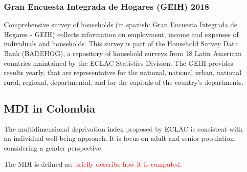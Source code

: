 \documentclass[a4paper, 11pt]{article}
\begin{document}
\subsubsection{Gran Encuesta Integrada de Hogares (GEIH) 2018}

Comprehensive survey of households (in spanish: Gran Encuesta Integrada de Hogares - GEIH) collects information on employment, income and expenses of individuals and households. This survey is part of the Household Survey Data Bank (BADEHOG), a repository of household surveys from 18 Latin American countries maintained by the ECLAC Statistics Division.  The GEIH provides results yearly, that are representative for the national, national urban, national rural, regional, departmental, and for the capitals of the country's departments.  
    

    

\subsection{MDI in Colombia}

The multidimensional deprivation index proposed by ECLAC is consistent with an individual well-being approach. It is focus on adult and senior population, considering a gender perspective.


The MDI is defined as: 
\textcolor{red}{briefly describe how it is computed.}
\end{document}
